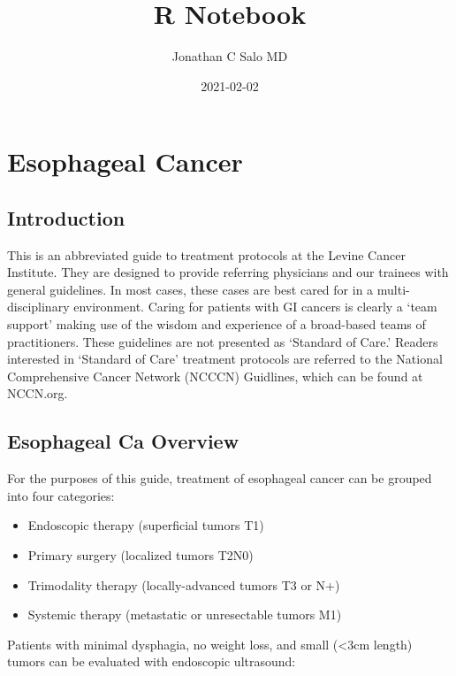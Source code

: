 \documentclass[
]{book}
\title{R Notebook}
\author{Jonathan C Salo MD}
\date{2021-02-02}
\providecommand{\tightlist}{%
  \setlength{\itemsep}{0pt}\setlength{\parskip}{0pt}}
\begin{document}
\maketitle

{
\setcounter{tocdepth}{1}
\tableofcontents
}
\hypertarget{part-esophageal-cancer}{%
\part*{Esophageal Cancer}\label{part-esophageal-cancer}}

\hypertarget{introduction}{%
\chapter*{Introduction}\label{introduction}}

This is an abbreviated guide to treatment protocols at the Levine Cancer Institute. They are designed to provide referring physicians and our trainees with general guidelines. In most cases, these cases are best cared for in a multi-disciplinary environment. Caring for patients with GI cancers is clearly a `team support' making use of the wisdom and experience of a broad-based teams of practitioners. These guidelines are not presented as `Standard of Care.' Readers interested in `Standard of Care' treatment protocols are referred to the National Comprehensive Cancer Network (NCCCN) Guidlines, which can be found at NCCN.org.

\hypertarget{EsoIntro}{%
\chapter{Esophageal Ca Overview}\label{EsoIntro}}

For the purposes of this guide, treatment of esophageal cancer can be grouped into four categories:

\begin{itemize}
\tightlist
\item
  Endoscopic therapy (superficial tumors T1)
\item
  Primary surgery (localized tumors T2N0)
\item
  Trimodality therapy (locally-advanced tumors T3 or N+)
\item
  Systemic therapy (metastatic or unresectable tumors M1)
\end{itemize}

Patients with minimal dysphagia, no weight loss, and small (\textless3cm length) tumors can be evaluated with endoscopic ultrasound:
\end{document}
